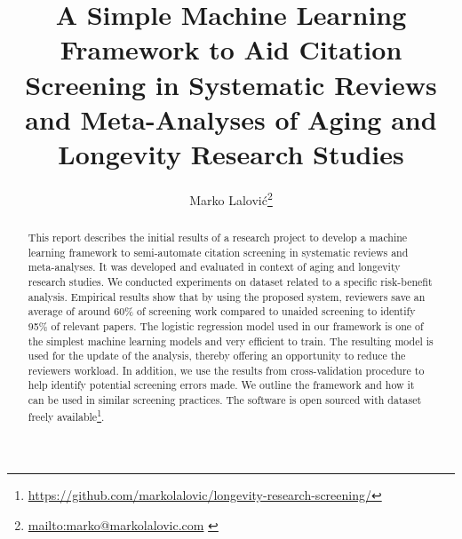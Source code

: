 \documentclass[10pt,twocolumn,letterpaper]{article}
\title{A Simple Machine Learning Framework to Aid Citation Screening in
Systematic Reviews and Meta-Analyses of Aging and Longevity Research Studies}
\author{%
	Marko Lalović\thanks{\footnotesize{%
	\url{mailto:marko@markolalovic.com}%
	}}
}
\renewcommand{\footnotesize}{\fontsize{7.5pt}{7.5pt}\selectfont}
\begin{document}
%
\saythanks

%

\begin{abstract}
{This report describes the initial results of a research project to develop a machine learning framework to semi-automate citation screening in systematic reviews and meta-analyses. It was developed and evaluated in context of aging and longevity research studies. We conducted experiments on dataset related to a specific risk-benefit analysis. Empirical results show that by using the proposed system, reviewers save an average of around 60\% of screening work compared to unaided screening to identify 95\% of relevant papers. The logistic regression model used in our framework is one of the simplest machine learning models and very efficient to train. The resulting model is used for the update of the analysis, thereby offering an opportunity to reduce the reviewers workload. In addition, we use the results from cross-validation procedure to help identify potential screening errors made. We outline the framework and how it can be used in similar screening practices. The software  is open sourced with dataset freely available{\footnote{\url{https://github.com/markolalovic/longevity-research-screening/}}}.
}
\end{abstract}
\end{document}
